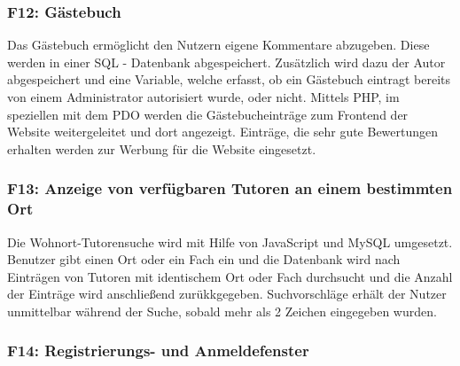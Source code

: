 \documentclass[10pt,a4paper]{scrartcl}
\begin{document}
\subsubsection*{F12: Gästebuch}

Das Gästebuch ermöglicht den Nutzern eigene Kommentare abzugeben. Diese werden in einer SQL - Datenbank abgespeichert. Zusätzlich wird dazu der Autor abgespeichert und eine Variable, welche erfasst, ob ein Gästebuch eintragt bereits von einem Administrator autorisiert wurde, oder nicht. Mittels PHP, im speziellen mit dem PDO werden die Gästebucheinträge zum Frontend der Website weitergeleitet und dort angezeigt. Einträge, die sehr gute Bewertungen erhalten werden zur Werbung für die Website eingesetzt.

\subsubsection*{F13: Anzeige von verfügbaren Tutoren an einem bestimmten Ort}

Die Wohnort-Tutorensuche wird mit Hilfe von JavaScript und MySQL umgesetzt. Benutzer gibt einen Ort oder ein Fach ein und die Datenbank wird nach Eintr\"agen von Tutoren mit identischem Ort oder Fach durchsucht und die Anzahl der Eintr\"age wird anschlie{\ss}end zur\"ukkgegeben. 
Suchvorschläge erhält der Nutzer unmittelbar während der Suche, sobald mehr als 
2 Zeichen eingegeben wurden. 
%
%

\subsubsection*{F14: Registrierungs- und Anmeldefenster}
\end{document}
